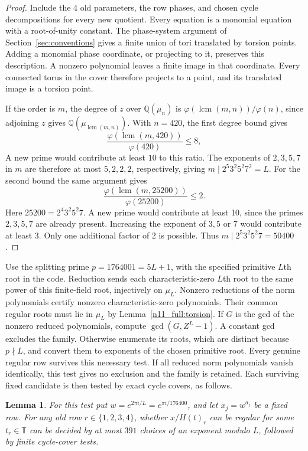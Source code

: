 \documentclass[11pt,a4paper]{article}
\newtheorem{lemma}[theorem]{Lemma}
\theoremstyle{plain}
\theoremstyle{definition}
\theoremstyle{plain}
\begin{document}
\begin{proof}
Include the 4 old parameters, the row phases, and chosen cycle decompositions for every new quotient. Every equation is a monomial equation with a root-of-unity constant. The phase-system argument of Section~\ref{sec:conventions} gives a finite union of tori translated by torsion points. Adding a monomial phase coordinate, or projecting to it, preserves this description. A nonzero polynomial leaves a finite image in that coordinate. Every connected torus in the cover therefore projects to a point, and its translated image is a torsion point.

If the order is $m$, the degree of $z$ over $\mathbb Q(\mu_n)$ is $\varphi(\operatorname{lcm}(m,n))/\varphi(n)$, since adjoining $z$ gives $\mathbb Q(\mu_{\operatorname{lcm}(m,n)})$. With $n=420$, the first degree bound gives
$$\frac{\varphi(\operatorname{lcm}(m,420))}{\varphi(420)}\leq8,$$
A new prime would contribute at least $10$ to this ratio. The exponents of $2,3,5,7$ in $m$ are therefore at most $5,2,2,2$, respectively, giving $m\mid2^5 3^2 5^2 7^2=L$. For the second bound the same argument gives
$$\frac{\varphi(\operatorname{lcm}(m,25200))}{\varphi(25200)}\leq2.$$
Here $25200=2^4 3^2 5^2 7$. A new prime would contribute at least 10, since the primes $2,3,5,7$ are already present. Increasing the exponent of $3,5$ or $7$ would contribute at least 3. Only one additional factor of 2 is possible. Thus $m\mid2^5 3^2 5^2 7=50400$.
\end{proof}

\medskip
Use the splitting prime $p=1764001=5L+1$, with the specified primitive $L$th root in the code. Reduction sends each characteristic-zero $L$th root to the same power of this finite-field root, injectively on $\mu_L$. Nonzero reductions of the norm polynomials certify nonzero characteristic-zero polynomials. Their common regular roots must lie in $\mu_L$ by Lemma~\ref{n11_full:torsion}. If $G$ is the gcd of the nonzero reduced polynomials, compute $\gcd(G,Z^L-1)$. A constant gcd excludes the family. Otherwise enumerate its roots, which are distinct because $p\nmid L$, and convert them to exponents of the chosen primitive root. Every genuine regular row survives this necessary test. If all reduced norm polynomials vanish identically, this test gives no exclusion and the family is retained. Each surviving fixed candidate is then tested by exact cycle covers, as follows.

\par\addvspace{\medskipamount}\noindent
\begin{minipage}{\linewidth}
\begin{lemma}\label{n11_full:pointtest}
For this test put $w=e^{2\pi i/L}=e^{\pi i/176400}$, and let $x_j=w^{a_j}$ be a fixed row. For any old row $r\in\{1,2,3,4\}$, whether $x/H(t)_r$ can be regular for some $t_r\in\mathbb T$ can be decided by at most $391$ choices of an exponent modulo $L$, followed by finite cycle-cover tests.
\end{lemma}
\end{minipage}
\par\addvspace{\medskipamount}
\end{document}
